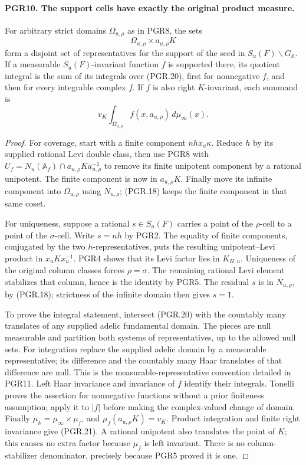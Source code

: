 \paragraph{PGR10. The support cells have exactly the original product measure.}
\label{claim:PGR10}
For arbitrary strict domains \(\Omega_{u,\rho}\) as in PGR8,
the sets
\[
              \Omega_{u,\rho}\times a_{u,\rho}K
\tag{PGR.20}
\]
form a disjoint set of representatives for the support of the seed in
\(S_u(F)\backslash G_{\mathbb A}\).  If a measurable
\(S_u(F)\)-invariant function \(f\) is supported there, its
quotient integral is the sum of its integrals over (PGR.20), first
for nonnegative \(f\), and then for every integrable complex \(f\).
If \(f\) is also right \(K\)-invariant, each summand is
\[
                  v_K\int_{\Omega_{u,\rho}}f(x,a_{u,\rho})\,d\mu_\infty(x).
\tag{PGR.21}
\]
\begin{proof}
For coverage, start with a finite component \(nhx_u\kappa\).
Reduce \(h\) by its supplied rational Levi double class, then
use PGR8 with
\(U_f=N_u(\mathbb A_f)\cap a_{u,\rho}Ka_{u,\rho}^{-1}\)
to remove its finite unipotent component by a rational unipotent.
The finite component is now in \(a_{u,\rho}K\).  Finally move
its infinite component into \(\Omega_{u,\rho}\) using
\(N_{u,\rho}\); (PGR.18) keeps the finite component in that
same coset.

For uniqueness, suppose a rational \(s\in S_u(F)\) carries
a point of the \(\rho\)-cell to a point of the \(\sigma\)-cell.
Write \(s=nh\) by PGR2.  The equality of finite components,
conjugated by the two \(h\)-representatives, puts the resulting
unipotent--Levi product in \(x_uKx_u^{-1}\).
PGR4 shows that its Levi factor lies in \(K_{H,u}\).
Uniqueness of the original column classes forces \(\rho=\sigma\).
The remaining rational Levi element stabilizes that column, hence
is the identity by PGR5.  The residual \(s\) is in
\(N_{u,\rho}\), by (PGR.18); strictness of the infinite domain
then gives \(s=1\).

To prove the integral statement, intersect (PGR.20) with the
countably many translates of any supplied adelic fundamental domain.
The pieces are null measurable and partition both systems of
representatives, up to the allowed null sets.  For integration replace
the supplied adelic domain by a measurable representative; its difference
and the countably many Haar translates of that difference are null.
This is the measurable-representative convention detailed in PGR11.
Left Haar invariance and invariance of
\(f\) identify their integrals.  Tonelli proves the assertion for
nonnegative functions without a prior finiteness assumption; apply
it to \(|f|\) before making the complex-valued change of domain.
Finally \(\mu_{\mathbb A}=\mu_\infty\times\mu_f\), and
\(\mu_f(a_{u,\rho}K)=v_K\).  Product integration and finite
right invariance give (PGR.21).  A rational unipotent also translates
the point of \(K\); this causes no extra factor because \(\mu_f\)
is left invariant.  There is no column-stabilizer denominator, precisely
because PGR5 proved it is one.
\end{proof}

